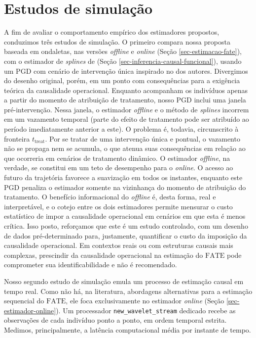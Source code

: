 \chapter[Estudos de simulação]{Estudos de simulação}\label{sec-estudos-simulacao}
A fim de avaliar o comportamento empírico dos estimadores propostos, conduzimos três estudos de simulação. 
O primeiro compara nossa proposta baseada em ondaletas, nas versões \emph{offline} e \emph{online} (Seção \ref{sec-estimacao-fate}), com o estimador de \emph{splines} de  (Seção \ref{sec-inferencia-causal-funcional}), usando um PGD com cenário de intervenção única inspirado no dos autores. 
Divergimos do desenho original, porém, em um ponto com consequências para a exigência teórica da causalidade operacional. 
Enquanto  acompanham os indivíduos apenas a partir do momento de atribuição de tratamento, nosso PGD inclui uma janela pré-intervenção. 
Nessa janela, o estimador \emph{offline} e o método de \emph{splines} incorrem em um vazamento temporal (parte do efeito de tratamento pode ser atribuído ao período imediatamente anterior a este). 
O problema é, todavia, circunscrito à fronteira \(t_{\text{treat}}\). 
Por se tratar de uma intervenção única e pontual, o vazamento não se propaga nem se acumula, o que atenua suas consequências em relação ao que ocorreria em cenários de tratamento dinâmico. 
O estimador \emph{offline}, na verdade, se constitui em um teto de desempenho para o \emph{online}. 
O acesso ao futuro da trajetória favorece a suavização em todos os instantes, enquanto este PGD penaliza o estimador somente na vizinhança do momento de atribuição do tratamento.
O benefício informacional do \emph{offline} é, desta forma, real e interpretável, e o cotejo entre os dois estimadores permite mensurar o custo estatístico de impor a causalidade operacional em cenários em que esta é menos crítica. 
Isso posto, reforçamos que este é um estudo controlado, com um desenho de dados pré-determinado para, justamente, quantificar o custo da imposição da causalidade operacional.
Em contextos reais ou com estruturas causais mais complexas, prescindir da causalidade operacional na estimação do \(\mathrm{FATE}\) pode comprometer sua identificabilidade e não é recomendado.

Nosso segundo estudo de simulação emula um processo de estimação causal em tempo real. 
Como não há, na literatura, abordagens alternativas para a estimação sequencial do \(\mathrm{FATE}\), ele foca exclusivamente no estimador \emph{online} (Seção \ref{sec-estimador-online}). 
Um processador \texttt{new\_wavelet\_stream} dedicado recebe as observações de cada indivíduo ponto a ponto, em ordem temporal estrita. 
Medimos, principalmente, a latência computacional média por instante de tempo.

